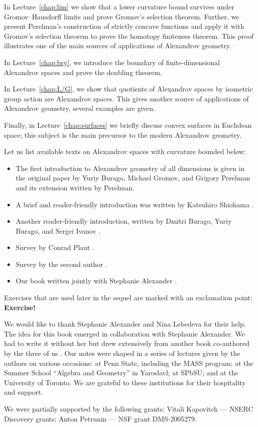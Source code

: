 In Lecture~\ref{chap:lim} we show that a lower curvature bound survives under Gromov--Hausdorff limits and prove Gromov's selection theorem.
Further, we present Perelman's construction of strictly concave functions and apply it with Gromov's selection theorem to prove the homotopy finiteness theorem.
This proof illustrates one of the main sources of applications of Alexandrov geometry.

In Lecture~\ref{chap:bry}, we introduce the boundary of finite-dimensional Alexandrov spaces and prove the doubling theorem.

In Lecture~\ref{chap:L/G}, we show that quotients of Alexandrov spaces by isometric group action are Alexandrov spaces.
This gives another source of applications of Alexandrov geometry, several examples are given.


Finally, in Lecture~\ref{chap:surfaces} we briefly discuss convex surfaces in Euclidean space; this subject is the main precursor to the modern Alexandrov geometry.

Let us list available texts on Alexandrov spaces with curvature bounded below:
\begin{itemize}
\item The first introduction to Alexandrov geometry of all dimensions is given in the original paper by Yuriy Burago, Michael Gromov, and Grigory Perelman \cite{burago-gromov-perelman} 
and its extension \cite{perelman1991} written by Perelman.
\item A brief and reader-friendly introduction was written by Katsuhiro Shiohama \cite[Sections 1--8]{shiohama}.
\item Another reader-friendly introduction, written by Dmitri Burago, Yuriy
Burago, and Sergei Ivanov \cite[Chapter 10]{burago-burago-ivanov}.
\item Survey by Conrad Plaut \cite{plaut:survey}.
\item Survey by the second author \cite{petrunin:survey}.
\item Our book written jointly with Stephanie Alexander \cite{alexander-kapovitch-petrunin2024}.
\end{itemize}

Exercises that are used later in the sequel are marked with an exclamation point: \textbf{Exercise!}

We would like to thank Stephanie Alexander and Nina Lebedeva for their help.
The idea for this book emerged in collaboration with Stephanie Alexander.
We had to write it without her but drew extensively from another book co-authored by the three of us \cite{alexander-kapovitch-petrunin2024}.
Our notes were shaped in a series of lectures given by the authors on various occasions: at Penn State, including the MASS program; at the Summer School “Algebra and Geometry” in Yaroslavl; at SPbSU; and at the University of Toronto.
We are grateful to these institutions for their hospitality and support.

We were partially supported by the following grants:
Vitali Kapovitch ---   NSERC Discovery grants;
Anton Petrunin --- 
NSF grant DMS-2005279. %


